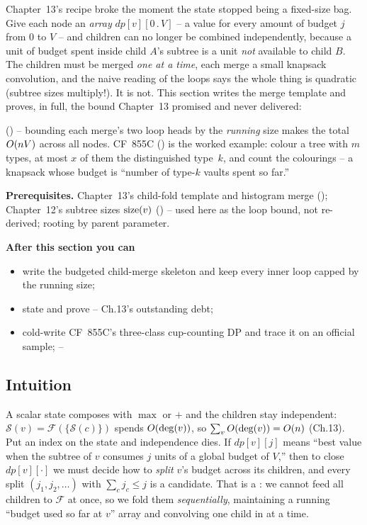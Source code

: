 \begin{topicintro}
Chapter~13's recipe broke the moment the state stopped being a fixed-size
bag. Give each node an \emph{array} $\mathit{dp}[v][0\,.\,V]$ -- a value for
every amount of budget $j$ from $0$ to $V$ -- and children can no longer be
combined independently, because a unit of budget spent inside child $A$'s
subtree is a unit \emph{not} available to child $B$. The children must be
merged \emph{one at a time}, each merge a small knapsack convolution, and the
naive reading of the loops says the whole thing is quadratic (subtree sizes
multiply!). It is not. This section writes the merge template and proves, in
full, the bound Chapter~13 promised and never delivered:

 () -- bounding each
merge's two loop heads by the \emph{running} size makes the total
$O(nV)$ across all nodes. CF~855C () is the
worked example: colour a tree with $m$ types, at most $x$ of them the
distinguished type~$k$, and count the colourings -- a knapsack whose budget
is ``number of type-$k$ vaults spent so far.''

\textbf{Prerequisites.} Chapter~13's child-fold template
 and histogram merge ();
Chapter~12's subtree sizes $\operatorname{size}(v)$ () -- used here as the
loop bound, not re-derived;  rooting by parent parameter.

\textbf{After this section you can}
\begin{itemize}[nosep]
  \item write the budgeted child-merge skeleton and keep every inner loop
        capped by the running size; \hfill{}
  \item state and prove  -- Ch.13's outstanding debt; \hfill{}
  \item cold-write CF~855C's three-class cup-counting DP and trace it on an
        official sample; \hfill{}--
\end{itemize}
\end{topicintro}

\subsection{Intuition}

A scalar state composes with $\max$ or $+$ and the children stay independent:
$\mathcal S(v) = \mathcal F(\{\mathcal S(c)\})$ spends $O(\deg(v))$, so
$\sum_v O(\deg(v)) = O(n)$ (Ch.13). Put an index on the state and
independence dies. If $\mathit{dp}[v][j]$ means ``best value when the subtree
of $v$ consumes $j$ units of a global budget of $V$,'' then to close
$\mathit{dp}[v][\cdot]$ we must decide how to \emph{split} $v$'s budget
across its children, and every split $(j_1, j_2, \dots)$ with
$\sum_c j_c \le j$ is a candidate. That is a : we cannot feed
all children to $\mathcal F$ at once, so we fold them \emph{sequentially},
maintaining a running ``budget used so far at $v$'' array and convolving one
child in at a time.


